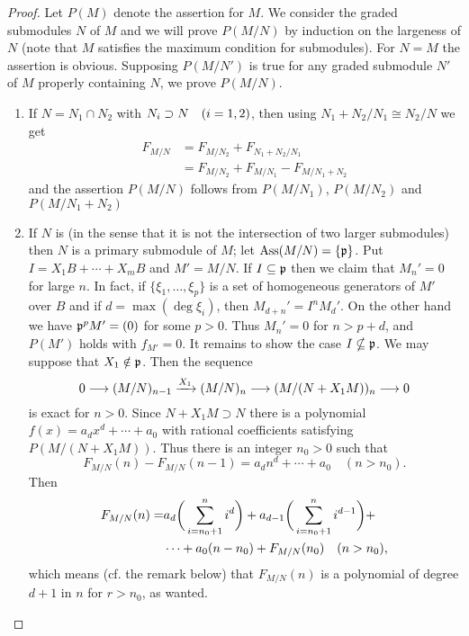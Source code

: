 \documentclass[../main]{subfiles}
\begin{document}
\begin{proof}
Let $P(M)$ denote the assertion for $M$. We consider the graded submodules $N$ of $M$ and we will prove $P(M/N)$ by induction on the largeness of $N$ (note that $M$ satisfies the maximum condition for submodules). For $N=M$ the assertion is obvious. Supposing $P(M / N')$ is true for any graded submodule $N'$ of $M$ properly containing $N$, we prove $P(M / N)$.
\begin{enumerate}[label = Case \arabic*.]
    \item If $N=N_1 \cap N_2$ with $N_i \supset N\for{i=1,2}$, then using $N_1+N_2 / N_1 \cong N_2 / N$ we get
    \[\begin{aligned}
    F_{M / N} &=F_{M / N_2}+F_{N_1+N_2 / N_1} \\
    &=F_{M / N_2}+F_{M / N_1}-F_{M / N_1+N_2}
    \end{aligned}\]
    and the assertion $P(M / N)$ follows from $P(M / N_1)$, $P(M / N_2)$ and\newline $P(M / N_1+N_2)$
    
    \item If $N$ is  (in the sense that it is not the intersection of two larger submodules) then $N$ is a primary submodule of $M$; let $\operatorname{Ass}(M / N)=\{\mathfrak{p}\}$. Put $I=X_1 B+\cdots+X_mB$ and $M'=M / N$. If $I \subseteq \mathfrak{p}$ then we claim that $M_n'= 0$ for large $n$. In fact, if $\{\xi_1, \ldots, \xi_p\}$ is a set of homogeneous generators of $M'$ over $B$ and if $d=\max(\deg \xi_i)$, then $M_{d+n}'=I^nM_d'$. On the other hand we have $\mathfrak{p}^pM'=(0)$ for some $p>0$. Thus $M_n'=0$ for $n>p+d$, and $P(M')$ holds with $f_{M'}=0$. It remains to show the case $I \nsubseteq \mathfrak{p}$. We may suppose that $X_1 \notin \mathfrak{p}$. Then the sequence
\[0\longrightarrow(M/N)_{n-1}\varrightarrow{X_1}(M/N)_n\longrightarrow(M/(N+X_1M))_n\longrightarrow0\]
is exact for $n>0$. Since $N+X_1 M \supset N$ there is a polynomial \newline $f(x)=a_d x^d+\cdots+a_0$ with rational coefficients satisfying $P(M/(N+X_1M))$. Thus there is an integer $n_0>0$ such that \[ F_{M / N}(n)-F_{M / N}(n-1)=a_d n^d+\cdots+a_0\quad(n>n_0).\] Then
\[\begin{aligned}
F_{M / N}(n)=& a_d\bigg(\sum_{i=n_0+1}^n i^d\bigg)+a_{d-1}\bigg(\sum_{i=n_0+1}^n i^{d-1}\bigg)+\\
&\cdots+a_0(n-n_0)+F_{M / N}(n_0) \for{n>n_0},
 \end{aligned}\]
which means (cf. the remark below) that $F_{M / N}(n)$ is a polynomial of degree $d+1$ in $n$ for $r>n_0$, as wanted.
\end{enumerate}

\end{proof}
\end{document}
